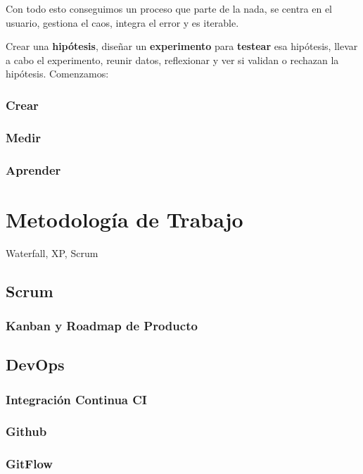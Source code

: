 \documentclass[12pt,twoside,titlepage]{report}
\begin{document}
Con todo esto conseguimos un proceso que parte de la nada, se centra en el usuario, gestiona el caos, integra el error y es iterable.

Crear una \textbf{hipótesis}, diseñar un \textbf{experimento} para \textbf{testear} esa hipótesis, llevar a cabo el experimento, reunir datos, reflexionar y ver si validan o rechazan la hipótesis. Comenzamos:

\subsubsection{Crear}

\subsubsection{Medir}

\subsubsection{Aprender}

\section{Metodología de Trabajo}

Waterfall, XP, Scrum

\subsection{Scrum}

\subsubsection{Kanban y Roadmap de Producto}

\subsection{DevOps}
\subsubsection{Integración Continua CI}
\subsubsection{Github}
\subsubsection{GitFlow}
\end{document}
